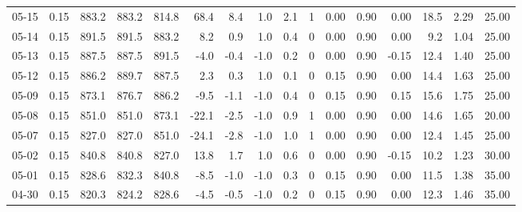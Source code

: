 \begin{threeparttable}
{\begin{tabular}{lrrrrrrrrrrrrrrr}
  05-15 &     0.15 & 883.2 & 883.2 & 814.8 &       68.4 &            8.4 &                      1.0 &                 2.1 &              1 &       0.00 &      0.90 &           0.00 &             18.5 &            2.29 &                  25.00 \\
  05-14 &     0.15 & 891.5 & 891.5 & 883.2 &        8.2 &            0.9 &                      1.0 &                 0.4 &              0 &       0.00 &      0.90 &           0.00 &              9.2 &            1.04 &                  25.00 \\
  05-13 &     0.15 & 887.5 & 887.5 & 891.5 &       -4.0 &           -0.4 &                     -1.0 &                 0.2 &              0 &       0.00 &      0.90 &          -0.15 &             12.4 &            1.40 &                  25.00 \\
  05-12 &     0.15 & 886.2 & 889.7 & 887.5 &        2.3 &            0.3 &                      1.0 &                 0.1 &              0 &       0.15 &      0.90 &           0.00 &             14.4 &            1.63 &                  25.00 \\
  05-09 &     0.15 & 873.1 & 876.7 & 886.2 &       -9.5 &           -1.1 &                     -1.0 &                 0.4 &              0 &       0.15 &      0.90 &           0.15 &             15.6 &            1.75 &                  25.00 \\
  05-08 &     0.15 & 851.0 & 851.0 & 873.1 &      -22.1 &           -2.5 &                     -1.0 &                 0.9 &              1 &       0.00 &      0.90 &           0.00 &             14.6 &            1.65 &                  20.00 \\
  05-07 &     0.15 & 827.0 & 827.0 & 851.0 &      -24.1 &           -2.8 &                     -1.0 &                 1.0 &              1 &       0.00 &      0.90 &           0.00 &             12.4 &            1.45 &                  25.00 \\
  05-02 &     0.15 & 840.8 & 840.8 & 827.0 &       13.8 &            1.7 &                      1.0 &                 0.6 &              0 &       0.00 &      0.90 &          -0.15 &             10.2 &            1.23 &                  30.00 \\
  05-01 &     0.15 & 828.6 & 832.3 & 840.8 &       -8.5 &           -1.0 &                     -1.0 &                 0.3 &              0 &       0.15 &      0.90 &           0.00 &             11.5 &            1.38 &                  35.00 \\
  04-30 &     0.15 & 820.3 & 824.2 & 828.6 &       -4.5 &           -0.5 &                     -1.0 &                 0.2 &              0 &       0.15 &      0.90 &           0.00 &             12.3 &            1.46 &                  35.00 \\

\end{tabular}}
\end{threeparttable}
